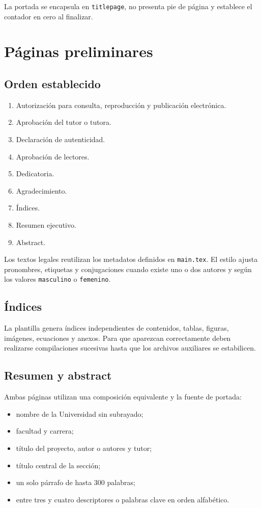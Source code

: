 \documentclass[12pt,a4paper,oneside]{report}
\begin{document}
La portada se encapsula en \texttt{titlepage}, no presenta pie de página y establece el contador en cero al finalizar.

\chapter{Páginas preliminares}

\section{Orden establecido}

\begin{enumerate}
  \item Autorización para consulta, reproducción y publicación electrónica.
  \item Aprobación del tutor o tutora.
  \item Declaración de autenticidad.
  \item Aprobación de lectores.
  \item Dedicatoria.
  \item Agradecimiento.
  \item Índices.
  \item Resumen ejecutivo.
  \item Abstract.
\end{enumerate}

Los textos legales reutilizan los metadatos definidos en \texttt{main.tex}. El estilo ajusta pronombres, etiquetas y conjugaciones cuando existe uno o dos autores y según los valores \texttt{masculino} o \texttt{femenino}.

\section{Índices}

La plantilla genera índices independientes de contenidos, tablas, figuras, imágenes, ecuaciones y anexos. Para que aparezcan correctamente deben realizarse compilaciones sucesivas hasta que los archivos auxiliares se estabilicen.

\section{Resumen y abstract}

Ambas páginas utilizan una composición equivalente y la fuente de portada:

\begin{itemize}
  \item nombre de la Universidad sin subrayado;
  \item facultad y carrera;
  \item título del proyecto, autor o autores y tutor;
  \item título central de la sección;
  \item un solo párrafo de hasta 300 palabras;
  \item entre tres y cuatro descriptores o palabras clave en orden alfabético.
\end{itemize}
\end{document}
